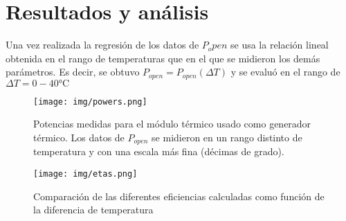 \section{Resultados y análisis}

Una vez realizada la regresión de los datos de $P_open$ se usa la relación lineal obtenida en el rango de temperaturas que en el que se midieron los demás parámetros. Es decir, se obtuvo $P_{open} = P_{open}(\Delta T)$ y se evaluó en el rango de $\Delta T = 0 - 40 \si{\celsius}$
\begin{figure}[h]
    \centering
    \texttt{[image: img/powers.png]}
    \caption{Potencias medidas para el módulo térmico usado como generador térmico. Los datos de $P_{open}$ se midieron en un rango distinto de temperatura y con una escala más fina (décimas de grado).}
    \label{fig:powers}
\end{figure}


\begin{figure}[h]
    \centering
    \texttt{[image: img/etas.png]}
    \caption{Comparación de las diferentes eficiencias calculadas como función de la diferencia de temperatura}
    \label{fig:etas}
\end{figure}